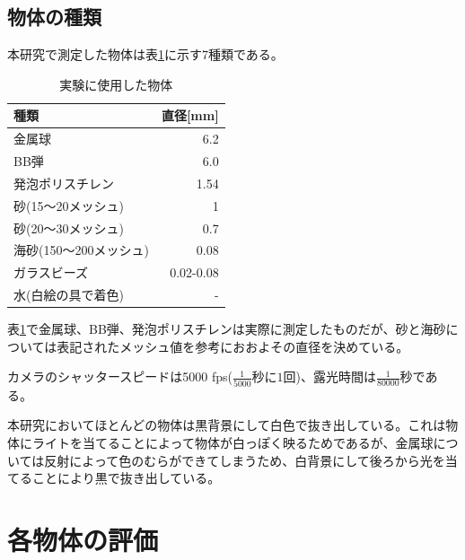 \documentclass[a4paper,10pt,twocolumn,dvipdfmx]{jsarticle}
\begin{document}
\subsection{物体の種類}
本研究で測定した物体は表\ref{tb:ballkind}に示す7種類である。 \\
\begin{table}[H]
	\caption{実験に使用した物体 \label{tb:ballkind}}
	\begin{tabular}{lr}
		\toprule
		種類 & 直径[mm] \\
		\midrule
		金属球 & 6.2 \\
		BB弾 & 6.0 \\
		発泡ポリスチレン & 1.54 \\
		砂(15〜20メッシュ) & 1 \\
		砂(20〜30メッシュ) & 0.7 \\
		海砂(150〜200メッシュ) & 0.08 \\
		ガラスビーズ & 0.02-0.08 \\
		水(白絵の具で着色) & - \\
		\bottomrule
	\end{tabular}
\end{table}

表\ref{tb:ballkind}で金属球、BB弾、発泡ポリスチレンは実際に測定したものだが、砂と海砂については表記されたメッシュ値を参考におおよその直径を決めている。 \par
カメラのシャッタースピードは5000 fps($\frac{1}{5000}秒に1回$)、露光時間は$\frac{1}{80000}秒$である。 \par
本研究においてほとんどの物体は黒背景にして白色で抜き出している。これは物体にライトを当てることによって物体が白っぽく映るためであるが、金属球については反射によって色のむらができてしまうため、白背景にして後ろから光を当てることにより黒で抜き出している。

\section{各物体の評価}
\end{document}
